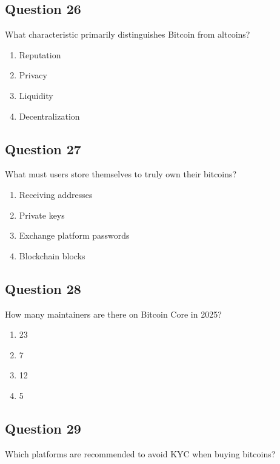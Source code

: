 \documentclass[12pt,a4paper]{article}
\begin{document}
\bigskip


\subsection*{Question 26}
What characteristic primarily distinguishes Bitcoin from altcoins?

\begin{enumerate}[label=\Alph*., leftmargin=*]
\item Reputation
\item Privacy
\item Liquidity
\item Decentralization
\end{enumerate}

\bigskip


\subsection*{Question 27}
What must users store themselves to truly own their bitcoins?

\begin{enumerate}[label=\Alph*., leftmargin=*]
\item Receiving addresses
\item Private keys
\item Exchange platform passwords
\item Blockchain blocks
\end{enumerate}

\bigskip


\subsection*{Question 28}
How many maintainers are there on Bitcoin Core in 2025?

\begin{enumerate}[label=\Alph*., leftmargin=*]
\item 23
\item 7
\item 12
\item 5
\end{enumerate}

\bigskip


\subsection*{Question 29}
Which platforms are recommended to avoid KYC when buying bitcoins?
\end{document}
